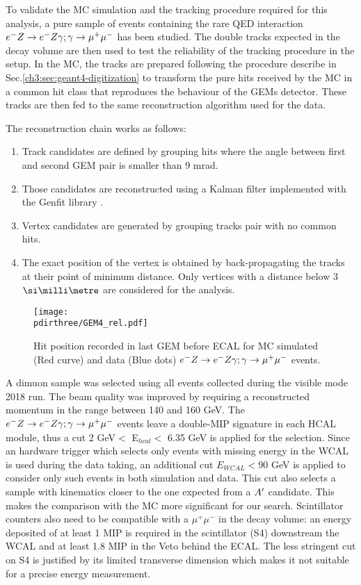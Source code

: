 To validate the MC simulation and the tracking procedure required for this analysis, a pure sample of events containing the rare QED interaction $\emu$ has been studied. The double tracks expected in the decay volume are then used to test the reliability of the tracking procedure in the setup. In the MC, the tracks are prepared following the procedure describe in Sec.\ref{ch3:sec:geant4-digitization} to transform the pure hits received by the MC in a common hit class that reproduces the behaviour of the GEMs detector. These tracks are then fed to the same reconstruction algorithm used for the data.

The reconstruction chain works as follows:
\begin{enumerate}
\item Track candidates are defined by grouping hits where the angle between first and second GEM pair is smaller than 9 mrad.
\item Those candidates are reconstructed using a Kalman filter implemented with the Genfit library \cite{genfit}.
\item Vertex candidates are generated by grouping tracks pair with no common hits.
\item The exact position of the vertex is obtained by back-propagating the tracks at their point of minimum distance. Only vertices with a distance below 3 $\mmi$ are considered for the analysis.
\end{enumerate}

\begin{figure}[tbh!]
  \begin{center}
    \texttt{[image: \\pdirthree/GEM4\_rel.pdf]}
  \end{center}

  \caption[Hit position of $\emu$ in GEM MC-DATA]{Hit position recorded in last GEM before ECAL for MC simulated (Red curve) and data (Blue dots) $\emu$ events.}
  \label{fig:dimuon:gemspectra}
\end{figure}
  

A dimuon sample was selected using all events collected during the visible mode 2018 run. The beam quality was improved by requiring a reconstructed momentum in the range between 140 and 160 GeV. The $\emu$ events leave a double-MIP signature in each HCAL module, thus a cut 2 GeV$<$ E$_{hcal} <$ 6.35 GeV is applied for the selection. Since an hardware trigger which selects only events with missing energy in the WCAL is used during the data taking, an additional cut $E_{WCAL} < 90$ GeV is applied to consider only such events in both simulation and data. This cut also selects a sample with kinematics closer to the one expected from a $A'$ candidate. This makes the comparison with the MC more significant for our search. Scintillator counters also need to be compatible with a $\mu^+ \mu^-$ in the decay volume: an energy deposited of at least 1 MIP is required in the scintillator (S4) downstream the WCAL and at least 1.8 MIP in the Veto behind the ECAL. The less stringent cut on S4 is justified by its limited transverse dimension which makes it not suitable for a precise energy measurement.

